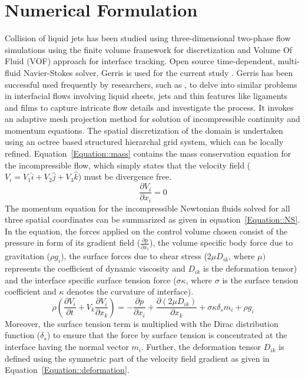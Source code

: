 \documentclass[%
aip,
sd,%
amsmath,amssymb,
preprint,%
author-year,%
]{revtex4-1}
\begin{document}
\section{Numerical Formulation}\label{Appendix::Numerical}
Collision of liquid jets has been studied using three-dimensional two-phase flow simulations using the finite volume framework for discretization and Volume Of Fluid (VOF) approach for interface tracking. Open source time-dependent, multi-fluid Navier-Stokes solver, Gerris is used for the current study \citep{Popinet2003}. Gerris has been successful used frequently by researchers, such as \cite{chen2013high,kumar2016physical,kumar2017bending}, to delve into similar problems in interfacial flows involving liquid sheets, jets and thin features like ligaments and films to capture intricate flow details and investigate the process. It invokes an adaptive mesh projection method for solution of incompressible continuity and momentum equations. The spatial discretization of the domain is undertaken using an octree based structured hierarchal grid system, which can be locally refined. Equation~\ref{Equation::mass} contains the mass conservation equation for the incompressible flow, which simply states that the velocity field ($V_i = V_1\hat{i} + V_2\hat{j} + V_3\hat{k}$) must be divergence free.   
\begin{equation} \label{Equation::mass}
\frac{\partial V_i}{\partial x_i} = 0
\end{equation}
The momentum equation for the incompressible Newtonian fluids solved for all three spatial coordinates can be summarized as given in equation~\ref{Equation::NS}. In the equation, the forces applied on the control volume chosen consist of the pressure in form of its gradient field ($\frac{\partial p}{\partial x_i}$), the volume specific body force due to gravitation ($\rho g_i$), the surface forces due to shear stress ($2\mu D_{ik}$, where $\mu)$ represents the coefficient of dynamic viscosity and $D_{ik}$ is the deformation tensor) and the interface specific surface tension force ($\sigma \kappa$, where $\sigma$ is the surface tension coefficient and $\kappa$ denotes the curvature of interface). 
\begin{equation} \label{Equation::NS}
\rho\left( \frac{\partial V_i}{\partial t} + V_k\frac{\partial V_i}{\partial x_k} \right) = -\frac{\partial p}{\partial x_i} + \frac{\partial (2\mu D_{ik})}{\partial x_k} + \sigma \kappa \delta_sm_i + \rho g_i
\end{equation}
Moreover, the surface tension term is multiplied with the Dirac distribution function ($\delta_s$) to ensure that the force by surface tension is concentrated at the interface having the normal vector $m_i$. Further, the deformation tensor $D_{ik}$ is defined using the symmetric part of the velocity field gradient as given in Equation~\ref{Equation::deformation}.
\end{document}
